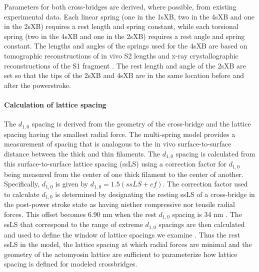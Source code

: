 \documentclass[]{article}
\begin{document}
Parameters for both cross-bridges are derived, where possible, from existing experimental data.  
Each linear spring (one in the 1sXB, two in the 4sXB and one in the 2sXB) requires a rest length and spring constant, while each torsional spring (two in the 4sXB and one in the 2sXB) requires a rest angle and spring constant.
The lengths and angles of the springs used for the 4sXB are based on tomographic reconstructions of in vivo S2 lengths and x-ray crystallographic reconstructions of the S1 fragment \citep{Taylor1999, Rayment1993}.
The rest length and angle of the 2sXB are set so that the tips of the 2sXB and 4sXB are in the same location before and after the powerstroke.



\paragraph{Calculation of lattice spacing} %
The $d_{1,0}$ spacing is derived from the geometry of the cross-bridge and the lattice spacing having the smallest radial force. 
The multi-spring model provides a measurement of spacing that is analogous to the in vivo surface-to-surface distance between the thick and thin filaments.
The $d_{1,0}$ spacing is calculated from this surface-to-surface lattice spacing (ssLS) using a correction factor for $d_{1,0}$ being measured from the center of one thick filament to the center of another. 
Specifically, $d_{1,0}$ is given by $d_{1,0} = 1.5 (ssLS + cf)$. %
The correction factor used to calculate $d_{1,0}$ is determined by designating the resting ssLS of a cross-bridge in the post-power stroke state as having niether compressive nor tensile radial forces. 
This offset becomes 6.90 nm when the rest $d_{1,0}$ spacing is 34 nm \citep{Brenner1991}. 
The ssLS that correspond to the range of extreme $d_{1,0}$ spacings are then calculated and used to define the window of lattice spacings we examine \citep{Millman1998}. %
Thus the rest ssLS in the model, the lattice spacing at which radial forces are minimal and the geometry of the actomyosin lattice are sufficient to parameterize how lattice spacing is defined for modeled crossbridges. 
\end{document}
